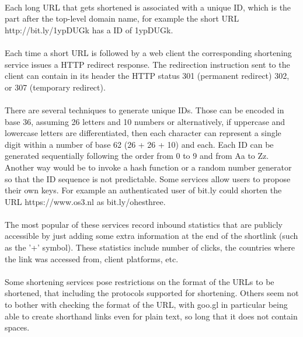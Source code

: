 \documentclass[12pt]{article}
\begin{document}
\paragraph{}
Each long URL that gets shortened is associated with a unique ID, which is the part after the top-level domain name, for example the short URL http://bit.ly/1ypDUGk has a ID of 1ypDUGk. 
\paragraph{}
Each time a short URL is followed by a web client the corresponding shortening service issues a HTTP redirect response. The redirection instruction sent to the client can contain in its header the HTTP status 301 (permanent redirect) 302, or 307 (temporary redirect).

\paragraph{}
There are several techniques to generate unique IDs. Those can be encoded in base 36, assuming 26 letters and 10 numbers or alternatively, if uppercase and lowercase letters are differentiated, then each character can represent a single digit within a number of base 62 (26 + 26 + 10) and each. Each ID can be generated sequentially following the order from 0 to 9 and from Aa to Zz. Another way would be to invoke a hash function or a random number generator so that the ID sequence is not predictable. Some services allow users to propose their own keys. For example an authenticated user of bit.ly could shorten the URL https://www.os3.nl as bit.ly/ohesthree. 

\paragraph{}
The most popular of these services record inbound statistics that are publicly accessible by just adding some extra information at the end of the shortlink (such as the '+' symbol). These statistics include number of clicks, the countries where the link was accessed from, client platforms, etc.

\paragraph{}
Some shortening services pose restrictions on the format of the URLs to be shortened, that including the protocols supported for shortening. Others seem not to bother with checking the format of the URL, with goo.gl in particular being able to create shorthand links even for plain text, so long that it does not contain spaces. 
\end{document}

